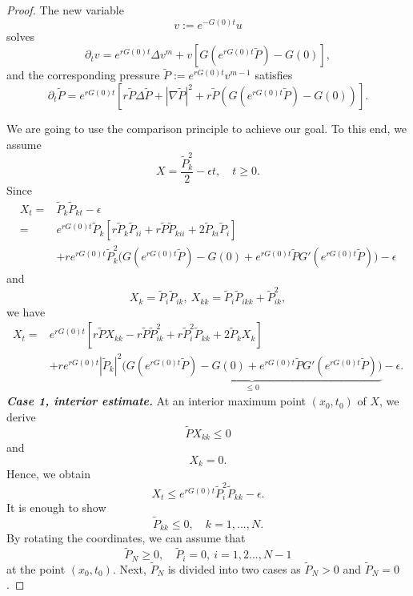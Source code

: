 \documentclass[10pt]{article}         %
\numberwithin{equation}{section}
\begin{document}
\begin{proof} 
The  new variable $$v:=e^{-G(0)t}u$$ solves
\[\partial_t v=e^{rG(0)t}\Delta v^m+v[G(e^{rG(0)t}\tilde{P})-G(0)],\]
and the corresponding pressure $\tilde{P}:=e^{rG(0)t}v^{m-1}$ satisfies
\[\partial_t\tilde{P}=e^{rG(0)t}[r\tilde{P}\Delta \tilde{P}+|\nabla \tilde{P}|^2+r\tilde{P}(G(e^{rG(0)t}\tilde{P})-G(0))].\]

We are going to use the comparison principle to achieve our goal.  To this end, we assume 
\[X=\frac{\tilde{P}_k^2}{2}-\epsilon t,\quad t\geq0.\]
Since
\[
\begin{aligned}X_t=&\tilde{P}_k\tilde{P}_{kt}-\epsilon
\\
=&e^{rG(0)t}\tilde{P}_k[r\tilde{P}_k\tilde{P}_{ii}+r\tilde{P}\tilde{P}_{kii}+2\tilde{P}_{ki}\tilde{P}_i]\\
&+re^{rG(0)t}\tilde{P}_k^2\big(G(e^{rG(0)t}\tilde{P})-G(0)+e^{rG(0)t}\tilde{P}G'(e^{rG(0)t}\tilde{P})\big)-\epsilon
\end{aligned}\]
and 
\[X_k=\tilde{P}_i\tilde{P}_{ik},\ X_{kk}=\tilde{P}_i\tilde{P}_{ikk}+\tilde{P}_{ik}^2,\]
we have
\[
\begin{aligned}X_t=&e^{rG(0)t}[r\tilde{P} X_{kk}-r\tilde{P}\tilde{P}_{ik}^2+r\tilde{P}_i^2\tilde{P}_{kk}+2\tilde{P}_kX_k]\\
&+re^{rG(0)t}|\tilde{P}_k|^2\underbrace{\big(G(e^{rG(0)t}\tilde{P})-G(0)+e^{rG(0)t}\tilde{P}G'(e^{rG(0)t}\tilde{P})\big)}_{\leq0}-\epsilon.\end{aligned}\]
\noindent\textbf{\emph{Case 1, interior estimate.}} At an interior maximum point $(x_0,t_0)$ of $X$, we derive
\begin{equation*}
\tilde{P}X_{kk}\leq 0
\end{equation*}
and 
\begin{equation*}
X_k=0.
\end{equation*}
Hence, we obtain 
\begin{equation}\label{pkk}X_t\leq e^{rG(0)t}\tilde{P}_i^2\tilde{P}_{kk}-\epsilon. \end{equation}
It is enough to show 
\begin{equation}\label{pkk1}\tilde{P}_{kk}\leq 0,\quad k=1,...,N.
\end{equation}
By rotating the coordinates, we can assume that \begin{equation*}\label{rc1}\tilde{P}_N\geq 0,\quad \tilde{P}_i=0,\ i=1,2...,N-1\end{equation*}at the point $(x_0,t_0)$.  Next, $\tilde{P}_N$ is divided into two cases as $\tilde{P}_N>0$ and $\tilde{P}_N=0$.


\end{proof}
\end{document}
